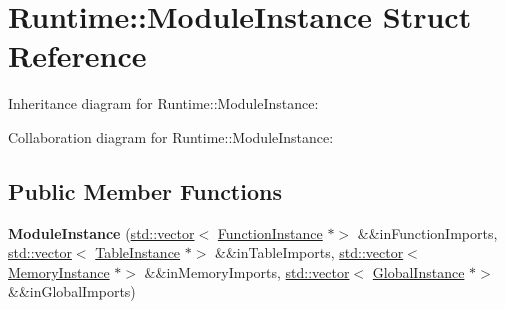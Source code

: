 \hypertarget{struct_runtime_1_1_module_instance}{}\section{Runtime\+:\+:Module\+Instance Struct Reference}
\label{struct_runtime_1_1_module_instance}


Inheritance diagram for Runtime\+:\+:Module\+Instance\+:


Collaboration diagram for Runtime\+:\+:Module\+Instance\+:
\subsection*{Public Member Functions}
\begin{DoxyCompactItemize}
\item 
\mbox{\label{struct_runtime_1_1_module_instance_ad9ebf10a21eb3333e31efc36b8fd7d96}} 
{\bfseries Module\+Instance} (\mbox{\hyperlink{classstd_1_1vector}{std\+::vector}}$<$ \mbox{\hyperlink{struct_runtime_1_1_function_instance}{Function\+Instance}} $\ast$$>$ \&\&in\+Function\+Imports, \mbox{\hyperlink{classstd_1_1vector}{std\+::vector}}$<$ \mbox{\hyperlink{struct_runtime_1_1_table_instance}{Table\+Instance}} $\ast$$>$ \&\&in\+Table\+Imports, \mbox{\hyperlink{classstd_1_1vector}{std\+::vector}}$<$ \mbox{\hyperlink{struct_runtime_1_1_memory_instance}{Memory\+Instance}} $\ast$$>$ \&\&in\+Memory\+Imports, \mbox{\hyperlink{classstd_1_1vector}{std\+::vector}}$<$ \mbox{\hyperlink{struct_runtime_1_1_global_instance}{Global\+Instance}} $\ast$$>$ \&\&in\+Global\+Imports)
\end{DoxyCompactItemize}
